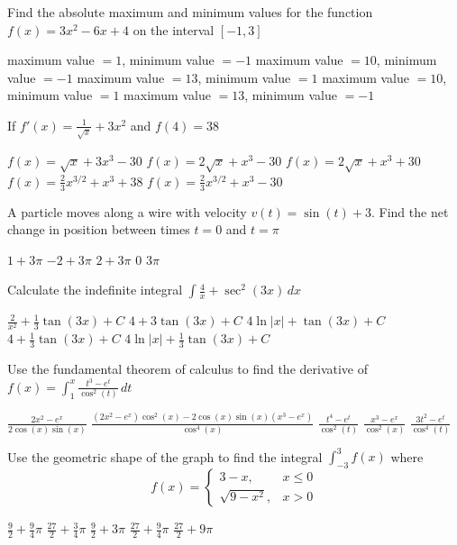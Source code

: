 \documentclass[11pt]{article}
\begin{document}
\begin{questions}
\begin{multiplechoice}{5}

\question Find the absolute maximum and minimum values for the function 
$f(x) = 3x^2 - 6x + 4$ on the interval $[-1, 3]$
\begin{answers}{1}
\ans maximum value $= 1$, minimum value $ = -1$
\ans maximum value $= 10$, minimum value $ = -1$
\ans maximum value $= 13$, minimum value $ = 1$
\ans maximum value $= 10$, minimum value $ = 1$
\ans maximum value $= 13$, minimum value $ = -1$
\end{answers}


\question If $f'(x) = \frac{1}{\sqrt{x}} + 3x^2$ and $f(4) = 38$
\begin{answers}{2}
\ans $f(x) = \sqrt{x} + 3x^3 -30$
\ans $f(x) = 2\sqrt{x} + x^3 - 30$
\ans $f(x) = 2\sqrt{x} + x^3 + 30$
\ans $f(x) = \frac{2}{3} x^{3/2} + x^3 + 38$
\ans $f(x) = \frac{2}{3} x^{3/2} + x^3 - 30$ 
\end{answers}


\question A particle moves along a wire with velocity $v(t) = \sin(t) + 3$.  Find the
net change in position between times $t = 0$ and $t = \pi$
\begin{answers}{2}
\ans $1  + 3\pi$
\ans $-2 + 3\pi$
\ans $2 + 3\pi$
\ans $0$
\ans $3\pi$
\end{answers}

\question Calculate the indefinite integral 
$\displaystyle \int \frac{4}{x} + \sec^2(3x) \, dx$
\begin{answers}{2}
\ans $\frac{2}{x^2} + \frac{1}{3}\tan(3x) + C$
\ans $4 + 3 \tan(3x) + C$
\ans $4 \ln|x|  + \tan(3x) + C$
\ans $4  + \frac{1}{3}\tan(3x) + C$
\ans $4 \ln |x| + \frac{1}{3}\tan(3x) + C$
\end{answers}


\newpage

\question Use the fundamental theorem of calculus to find the derivative of 
$\displaystyle f(x) = \int_1^x \frac{t^3 - e^t}{\cos^2(t)} \, dt$
\begin{answers}{2}
\ans $\frac{2x^2 - e^x}{2 \cos(x) \sin(x)}$
\ans $\frac{(2x^2 - e^x)\cos^2(x) - 2 \cos(x) \sin(x) (x^3 - e^x)}{\cos^4(x)}$
\ans $\frac{t^4 - e^t}{\cos^2(t)}$
\ans $\frac{x^3 - e^x}{\cos^2(x)}$
\ans $\frac{3 t^2 - e^t}{\cos^4(t)}$
\end{answers}

\question Use the geometric shape of the graph to find the integral 
$\displaystyle \int_{-3}^3 f(x)$ where 
$$ f(x) = 
\begin{cases}
3 - x, & x \le 0 \\
\sqrt{9 - x^2}, & x > 0
\end{cases}
$$
\begin{answers}{2}
\ans $\frac{9}{2} + \frac{9}{4}\pi$
\ans $\frac{27}{2} + \frac{3}{4}\pi$
\ans $\frac{9}{2} + 3\pi$
\ans $\frac{27}{2} + \frac{9}{4}\pi$
\ans $\frac{27}{2} + 9\pi$
\end{answers}


\end{multiplechoice}
\end{questions}
\end{document}
